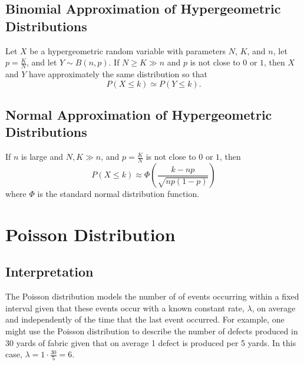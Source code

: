 \documentclass[1pt]{report}
\newcommand{\<}{\langle}
\renewcommand{\>}{\rangle}
\begin{document}
\subsection{Binomial Approximation of Hypergeometric Distributions}
Let $X$ be a hypergeometric random variable with parameters $N$, $K$, and $n$, let $p =\frac{K}{N}$, and let $Y \sim B(n,p)$. If $N\geq K \gg n$ and $p$ is not close to $0$ or $1$, then $X$ and $Y$ have approximately the same distribution so that 
$$P(X \leq k) \simeq P(Y \leq k).$$
\subsection{Normal Approximation of Hypergeometric Distributions}
If $n$ is large and $N, K \gg n$, and $p = \frac{K}{N}$ is not close to $0$ or $1$, then
$$P(X\leq k) \approx \Phi\left(\dfrac{k-np}{\sqrt{np(1-p)}}\right)$$
where $\Phi$ is the standard normal distribution function.
\newpage
\section{Poisson Distribution}
\subsection{Interpretation}
The Poisson distribution models the number of of events occurring within a fixed interval given that these events occur with a known constant rate, $\lambda$, on average and independently of the time that the last event occurred. For example, one might use the Poisson distribution to describe the number of defects produced in 30 yards of fabric given that on average 1 defect is produced per 5 yards. In this case, $\lambda = 1 \cdot \frac{30}{5} = 6$.
\end{document}

